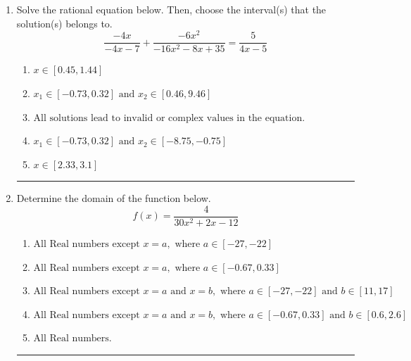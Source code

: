 \documentclass[14pt]{extbook}
\newcommand{\litem}[1]{\item#1\hspace*{-1cm}\rule{\textwidth}{0.4pt}}
\begin{document}
\begin{enumerate}
\litem{
Solve the rational equation below. Then, choose the interval(s) that the solution(s) belongs to.\[ \frac{-4x}{-4x -7} + \frac{-6x^{2}}{-16x^{2} -8 x + 35} = \frac{5}{4x -5} \]\begin{enumerate}[label=\Alph*.]
\item \( x \in [0.45,1.44] \)
\item \( x_1 \in [-0.73, 0.32] \text{ and } x_2 \in [0.46,9.46] \)
\item \( \text{All solutions lead to invalid or complex values in the equation.} \)
\item \( x_1 \in [-0.73, 0.32] \text{ and } x_2 \in [-8.75,-0.75] \)
\item \( x \in [2.33,3.1] \)

\end{enumerate} }
\litem{
Determine the domain of the function below.\[ f(x) = \frac{4}{30x^{2} +2 x -12} \]\begin{enumerate}[label=\Alph*.]
\item \( \text{All Real numbers except } x = a, \text{ where } a \in [-27, -22] \)
\item \( \text{All Real numbers except } x = a, \text{ where } a \in [-0.67, 0.33] \)
\item \( \text{All Real numbers except } x = a \text{ and } x = b, \text{ where } a \in [-27, -22] \text{ and } b \in [11, 17] \)
\item \( \text{All Real numbers except } x = a \text{ and } x = b, \text{ where } a \in [-0.67, 0.33] \text{ and } b \in [0.6, 2.6] \)
\item \( \text{All Real numbers.} \)


\end{enumerate}}
\end{enumerate}
\end{document}
